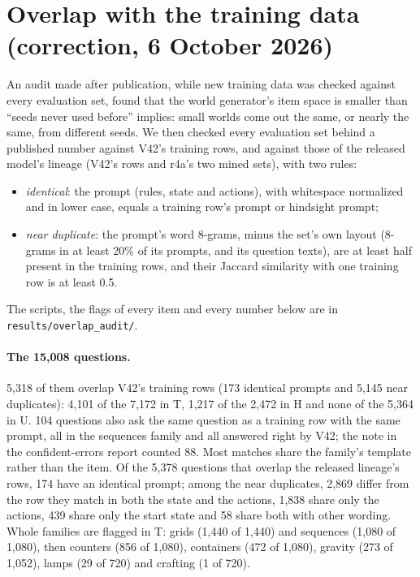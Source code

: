 \documentclass[11pt]{article}
\begin{document}
\section{Overlap with the training data (correction, 6 October 2026)}\label{app:overlap}
An audit made after publication, while new training data was checked against every evaluation set, found that the
world generator's item space is smaller than ``seeds never used before'' implies: small worlds come out the same, or
nearly the same, from different seeds. We then checked every evaluation set behind a published number against V42's
training rows, and against those of the released model's lineage (V42's rows and r4a's two mined sets), with two rules:
\begin{itemize}
  \item \emph{identical}: the prompt (rules, state and actions), with whitespace normalized and in lower case, equals a
  training row's prompt or hindsight prompt;
  \item \emph{near duplicate}: the prompt's word 8-grams, minus the set's own layout (8-grams in at least 20\% of its
  prompts, and its question texts), are at least half present in the training rows, and their Jaccard similarity with
  one training row is at least 0.5.
\end{itemize}
The scripts, the flags of every item and every number below are in \texttt{results/overlap\_audit/}.

\paragraph{The 15,008 questions.} 5,318 of them overlap V42's training rows (173 identical prompts and 5,145 near
duplicates): 4,101 of the 7,172 in T, 1,217 of the 2,472 in H and none of the 5,364 in U. 104 questions also ask the
same question as a training row with the same prompt, all in the sequences family and all answered right by V42; the
note in the confident-errors report counted 88. Most matches share the family's template rather than the item. Of the
5,378 questions that overlap the released lineage's rows, 174 have an identical prompt; among the near duplicates, 2,869
differ from the row they match in both the state and the actions, 1,838 share only the actions, 439 share only the start
state and 58 share both with other wording. Whole families are flagged in T: grids (1,440 of 1,440) and sequences (1,080
of 1,080), then counters (856 of 1,080), containers (472 of 1,080), gravity (273 of 1,052), lamps (29 of 720) and
crafting (1 of 720).
\end{document}
